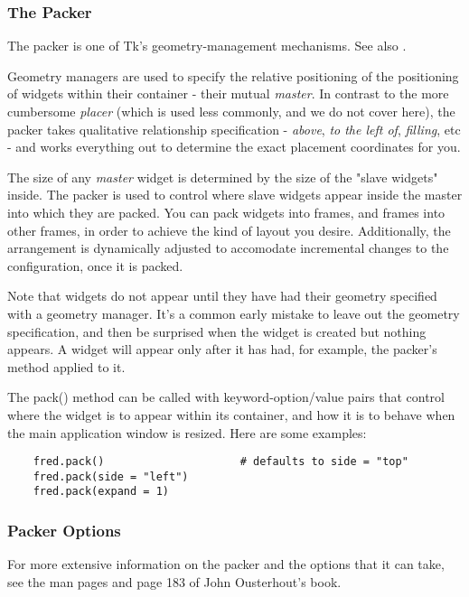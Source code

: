 \subsubsection{The Packer} %

The packer is one of Tk's geometry-management mechanisms.  See also
.

Geometry managers are used to specify the relative positioning of the
positioning of widgets within their container - their mutual
\emph{master}.  In contrast to the more cumbersome \emph{placer}
(which is used less commonly, and we do not cover here), the packer
takes qualitative relationship specification - \emph{above}, \emph{to
the left of}, \emph{filling}, etc - and works everything out to
determine the exact placement coordinates for you. 

The size of any \emph{master} widget is determined by the size of
the "slave widgets" inside.  The packer is used to control where slave
widgets appear inside the master into which they are packed.  You can
pack widgets into frames, and frames into other frames, in order to
achieve the kind of layout you desire.  Additionally, the arrangement
is dynamically adjusted to accomodate incremental changes to the
configuration, once it is packed.

Note that widgets do not appear until they have had their geometry
specified with a geometry manager.  It's a common early mistake to
leave out the geometry specification, and then be surprised when the
widget is created but nothing appears.  A widget will appear only
after it has had, for example, the packer's  method
applied to it.

The pack() method can be called with keyword-option/value pairs that
control where the widget is to appear within its container, and how it
is to behave when the main application window is resized.  Here are
some examples:

\begin{verbatim}
    fred.pack()                     # defaults to side = "top"
    fred.pack(side = "left")
    fred.pack(expand = 1)
\end{verbatim}


\subsubsection{Packer Options}

For more extensive information on the packer and the options that it
can take, see the man pages and page 183 of John Ousterhout's book.

